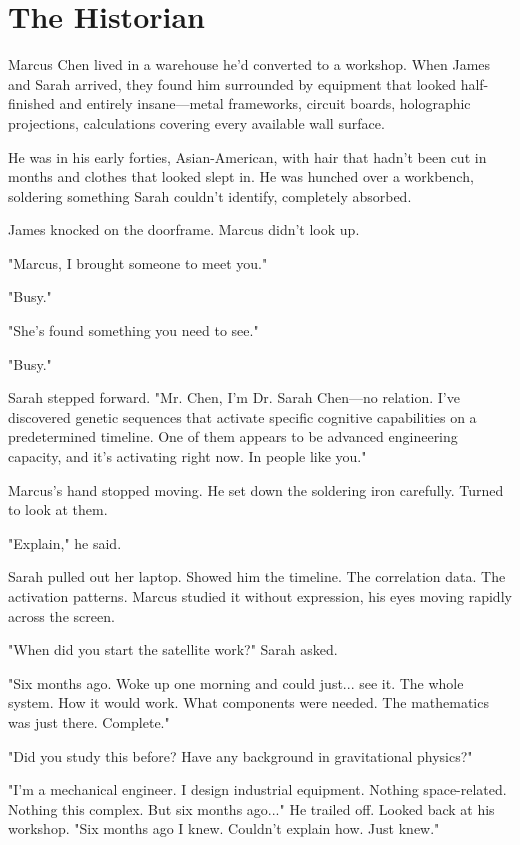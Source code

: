 \chapter{The Historian}
\label{ch:18}


Marcus Chen lived in a warehouse he'd converted to a workshop. When James and Sarah arrived, they found him surrounded by equipment that looked half-finished and entirely insane—metal frameworks, circuit boards, holographic projections, calculations covering every available wall surface.

He was in his early forties, Asian-American, with hair that hadn't been cut in months and clothes that looked slept in. He was hunched over a workbench, soldering something Sarah couldn't identify, completely absorbed.

James knocked on the doorframe. Marcus didn't look up.

"Marcus, I brought someone to meet you."

"Busy."

"She's found something you need to see."

"Busy."

Sarah stepped forward. "Mr. Chen, I'm Dr. Sarah Chen—no relation. I've discovered genetic sequences that activate specific cognitive capabilities on a predetermined timeline. One of them appears to be advanced engineering capacity, and it's activating right now. In people like you."

Marcus's hand stopped moving. He set down the soldering iron carefully. Turned to look at them.

"Explain," he said.

Sarah pulled out her laptop. Showed him the timeline. The correlation data. The activation patterns. Marcus studied it without expression, his eyes moving rapidly across the screen.

"When did you start the satellite work?" Sarah asked.

"Six months ago. Woke up one morning and could just... see it. The whole system. How it would work. What components were needed. The mathematics was just there. Complete."

"Did you study this before? Have any background in gravitational physics?"

"I'm a mechanical engineer. I design industrial equipment. Nothing space-related. Nothing this complex. But six months ago..." He trailed off. Looked back at his workshop. "Six months ago I knew. Couldn't explain how. Just knew."

